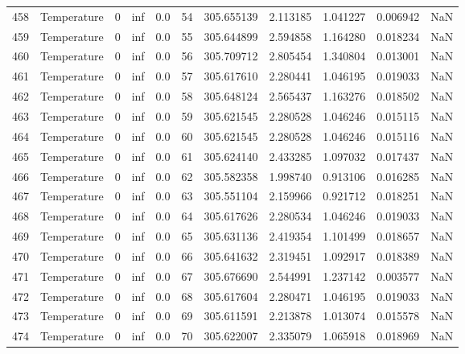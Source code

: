 \begin{tabular}{llrrrrrrrrr}
458 &  Temperature &       0 &  inf &  0.0 &   54 &  305.655139 &  2.113185 &  1.041227 &   0.006942 &      NaN \\
459 &  Temperature &       0 &  inf &  0.0 &   55 &  305.644899 &  2.594858 &  1.164280 &   0.018234 &      NaN \\
460 &  Temperature &       0 &  inf &  0.0 &   56 &  305.709712 &  2.805454 &  1.340804 &   0.013001 &      NaN \\
461 &  Temperature &       0 &  inf &  0.0 &   57 &  305.617610 &  2.280441 &  1.046195 &   0.019033 &      NaN \\
462 &  Temperature &       0 &  inf &  0.0 &   58 &  305.648124 &  2.565437 &  1.163276 &   0.018502 &      NaN \\
463 &  Temperature &       0 &  inf &  0.0 &   59 &  305.621545 &  2.280528 &  1.046246 &   0.015115 &      NaN \\
464 &  Temperature &       0 &  inf &  0.0 &   60 &  305.621545 &  2.280528 &  1.046246 &   0.015116 &      NaN \\
465 &  Temperature &       0 &  inf &  0.0 &   61 &  305.624140 &  2.433285 &  1.097032 &   0.017437 &      NaN \\
466 &  Temperature &       0 &  inf &  0.0 &   62 &  305.582358 &  1.998740 &  0.913106 &   0.016285 &      NaN \\
467 &  Temperature &       0 &  inf &  0.0 &   63 &  305.551104 &  2.159966 &  0.921712 &   0.018251 &      NaN \\
468 &  Temperature &       0 &  inf &  0.0 &   64 &  305.617626 &  2.280534 &  1.046246 &   0.019033 &      NaN \\
469 &  Temperature &       0 &  inf &  0.0 &   65 &  305.631136 &  2.419354 &  1.101499 &   0.018657 &      NaN \\
470 &  Temperature &       0 &  inf &  0.0 &   66 &  305.641632 &  2.319451 &  1.092917 &   0.018389 &      NaN \\
471 &  Temperature &       0 &  inf &  0.0 &   67 &  305.676690 &  2.544991 &  1.237142 &   0.003577 &      NaN \\
472 &  Temperature &       0 &  inf &  0.0 &   68 &  305.617604 &  2.280471 &  1.046195 &   0.019033 &      NaN \\
473 &  Temperature &       0 &  inf &  0.0 &   69 &  305.611591 &  2.213878 &  1.013074 &   0.015578 &      NaN \\
474 &  Temperature &       0 &  inf &  0.0 &   70 &  305.622007 &  2.335079 &  1.065918 &   0.018969 &      NaN \\

\end{tabular}
